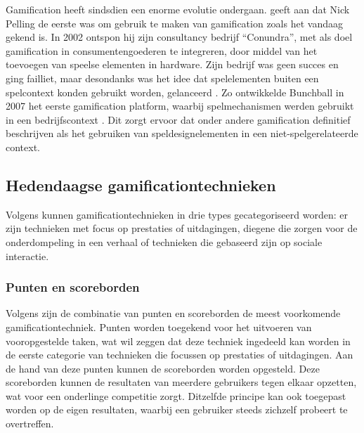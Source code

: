 Gamification heeft sindsdien een enorme evolutie ondergaan. \textcite{Dreimane2021} geeft aan dat Nick Pelling de eerste was om gebruik te maken van gamification zoals het vandaag gekend is. In 2002 ontspon hij zijn consultancy bedrijf “Conundra”, met als doel gamification in consumentengoederen te integreren, door middel van het toevoegen van speelse elementen in hardware. Zijn bedrijf was geen succes en ging failliet, maar desondanks was het idee dat spelelementen buiten een spelcontext konden gebruikt worden, gelanceerd \autocite{Khaitova2021}. Zo ontwikkelde Bunchball in 2007 het eerste gamification platform, waarbij spelmechanismen werden gebruikt in een bedrijfscontext \autocite{Khaitova2021}. Dit zorgt ervoor dat onder andere \textcite{Deterding2011} gamification definitief beschrijven als het gebruiken van speldesignelementen in een niet-spelgerelateerde context.


\subsection{Hedendaagse gamificationtechnieken}
\label{ssec:gamificationtechnieken}
Volgens \textcite{Legaki2020} kunnen gamificationtechnieken in drie types gecategoriseerd worden: er zijn technieken met focus op prestaties of uitdagingen, diegene die zorgen voor de onderdompeling in een verhaal of technieken die gebaseerd zijn op sociale interactie.

\subsubsection{Punten en scoreborden}
\label{sssec:labels_scoreborden}
Volgens \textcite{Hamari2014} zijn de combinatie van punten en scoreborden de meest voorkomende gamificationtechniek. Punten worden toegekend voor het uitvoeren van vooropgestelde taken, wat wil zeggen dat deze techniek ingedeeld kan worden in de eerste categorie van technieken die focussen op prestaties of uitdagingen. Aan de hand van deze punten kunnen de scoreborden worden opgesteld. Deze scoreborden kunnen de resultaten van meerdere gebruikers tegen elkaar opzetten, wat voor een onderlinge competitie zorgt. Ditzelfde principe kan ook toegepast worden op de eigen resultaten, waarbij een gebruiker steeds zichzelf probeert te overtreffen.

